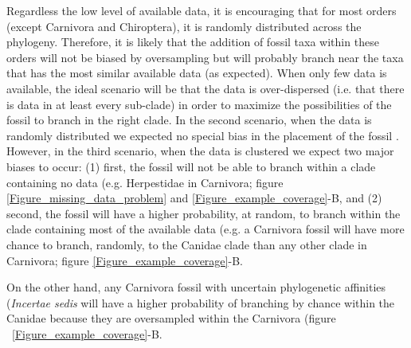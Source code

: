 \documentclass[12pt,letterpaper]{article}
\renewcommand{\subsection}[1]{%
\bigskip
\begin{center}
\begin{large}
\normalfont\itshape #1
\end{large}
\end{center}}
\begin{document}
Regardless the low level of available data, it is encouraging that for most orders (except Carnivora and Chiroptera), it is randomly distributed across the phylogeny.
Therefore, it is likely that the addition of fossil taxa within these orders will not be biased by oversampling but will probably branch near the taxa that has the most similar available data (as expected).
When only few data is available, the ideal scenario will be that the data is over-dispersed (i.e.
that there is data in at least every sub-clade) in order to maximize the possibilities of the fossil to branch in the right clade.
In the second scenario, when the data is randomly distributed we expected no special bias in the placement of the fossil \citep{GuillermeCooper}.
However, in the third scenario, when the data is clustered we expect two major biases to occur: (1) first, the fossil will not be able to branch within a clade containing no data (e.g.
Herpestidae in Carnivora; figure \ref{Figure_missing_data_problem} and \ref{Figure_example_coverage}-B, and (2) second, the fossil will have a higher probability, at random, to branch within the clade containing most of the available data (e.g.
a Carnivora fossil will have more chance to branch, randomly, to the Canidae clade than any other clade in Carnivora; figure \ref{Figure_example_coverage}-B.

On the other hand, any Carnivora fossil with uncertain phylogenetic affinities (\textit{Incertae sedis} will have a higher probability of branching by chance within the Canidae because they are oversampled within the Carnivora (figure ~\ref{Figure_example_coverage}-B.
\end{document}
